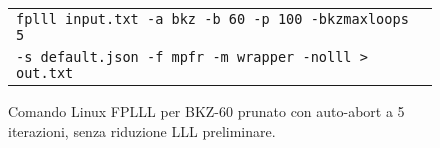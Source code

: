 \begin{figure}[h]
    \centering
    \begin{tabular}{l}
        \texttt{fplll input.txt -a bkz -b 60 -p 100 -bkzmaxloops 5} \\
        \texttt{-s default.json -f mpfr -m wrapper -nolll > out.txt} \\
    \end{tabular}
    \caption[Comando Linux FPLLL per BKZ-60.]
    {Comando Linux FPLLL per BKZ-60 prunato con auto-abort a 5 iterazioni, 
    senza riduzione LLL preliminare.}
    \label{fig:bkzcommand2}
\end{figure}